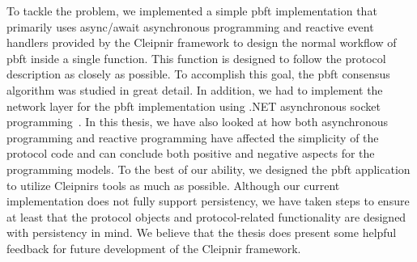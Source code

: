 \fi

To tackle the problem, we implemented a simple \ac{pbft} implementation that primarily uses async/await asynchronous programming and reactive event handlers provided by the Cleipnir framework to design the normal workflow of \ac{pbft} inside a single function. This function is designed to follow the protocol description as closely as possible. To accomplish this goal, the \ac{pbft} consensus algorithm was studied in great detail. In addition, we had to implement the network layer for the \ac{pbft} implementation using .NET asynchronous socket programming~\cite{DOC:AsyncSocketProg, VIDEO:dotnetsocketprog}. In this thesis, we have also looked at how both asynchronous programming and reactive programming have affected the simplicity of the protocol code and can conclude both positive and negative aspects for the programming models. To the best of our ability, we designed the \ac{pbft} application to utilize Cleipnirs tools as much as possible. Although our current implementation does not fully support persistency, we have taken steps to ensure at least that the protocol objects and protocol-related functionality are designed with persistency in mind. We believe that the thesis does present some helpful feedback for future development of the Cleipnir framework.

